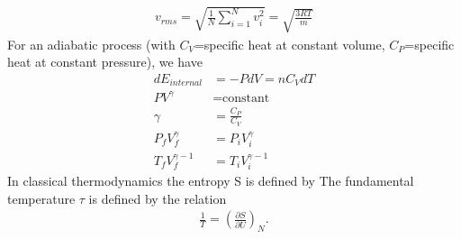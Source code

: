 \begin{multicols}{2}
\begin{align}
v_{rms}=\sqrt{\frac{1}{N}\sum_{i=1}^{N}v_i^2}=\sqrt{\frac{3RT}{m}}
\end{align}
For an adiabatic process (with $C_V$=specific heat at constant volume, $C_P$=specific heat at constant pressure), we have
\begin{align}
dE_{internal} &=-PdV=nC_VdT \\
PV^\gamma &= \textrm{constant} \\
\gamma &= \frac{C_P}{C_V} \\
P_fV_f^\gamma &= P_iV_i^\gamma \\
T_fV_f^{\gamma-1} &= T_iV_i^{\gamma-1}
\end{align}
In classical thermodynamics the entropy S is defined by
The fundamental temperature $\tau$ is defined by the relation
\begin{align}
	\frac{1}{T} = \left(\frac{\partial S}{\partial U}\right)_N.
\end{align}
\end{multicols}
